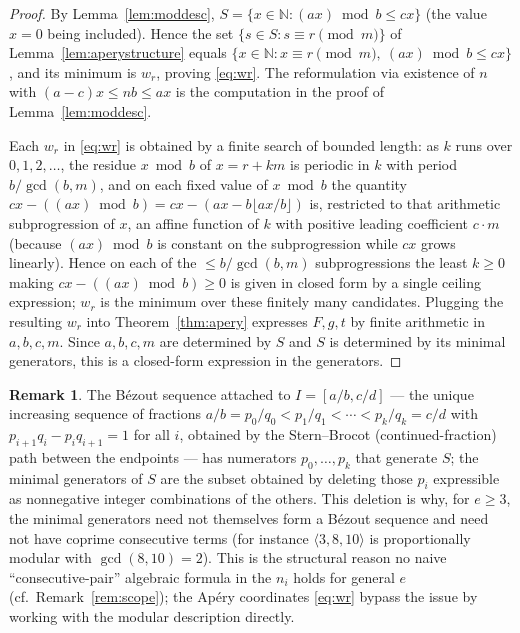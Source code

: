 \documentclass{amsart}
\theoremstyle{definition}
\newtheorem{remark}{Remark}
\newcommand{\NN}{\mathbb{N}}
\begin{document}
\begin{proof}
By Lemma~\ref{lem:moddesc}, $S=\{x\in\NN:(ax)\bmod b\le cx\}$ (the value
$x=0$ being included). Hence the set
$\{s\in S:s\equiv r\pmod m\}$ of Lemma~\ref{lem:aperystructure} equals
$\{x\in\NN:x\equiv r\pmod m,\ (ax)\bmod b\le cx\}$, and its minimum is
$w_r$, proving \eqref{eq:wr}. The reformulation via existence of $n$ with
$(a-c)x\le nb\le ax$ is the computation in the proof of
Lemma~\ref{lem:moddesc}.

Each $w_r$ in \eqref{eq:wr} is obtained by a finite search of bounded
length: as $k$ runs over $0,1,2,\dots$, the residue $x\bmod b$ of
$x=r+km$ is periodic in $k$ with period $b/\gcd(b,m)$, and on each fixed
value of $x\bmod b$ the quantity $cx-((ax)\bmod b)=cx-(ax-b\lfloor
ax/b\rfloor)$ is, restricted to that arithmetic subprogression of $x$, an
affine function of $k$ with positive leading coefficient $c\cdot m$
(because $(ax)\bmod b$ is constant on the subprogression while $cx$ grows
linearly). Hence on each of the $\le b/\gcd(b,m)$ subprogressions the least
$k\ge0$ making $cx-((ax)\bmod b)\ge0$ is given in closed form by a single
ceiling expression; $w_r$ is the minimum over these finitely many
candidates. Plugging the resulting $w_r$ into Theorem~\ref{thm:apery}
expresses $F,g,t$ by finite arithmetic in $a,b,c,m$. Since $a,b,c,m$ are
determined by $S$ and $S$ is determined by its minimal generators, this is
a closed-form expression in the generators.
\end{proof}

\begin{remark}
The B\'ezout sequence attached to $I=[a/b,c/d]$ --- the unique increasing
sequence of fractions $a/b=p_0/q_0<p_1/q_1<\cdots<p_k/q_k=c/d$ with
$p_{i+1}q_i-p_iq_{i+1}=1$ for all $i$, obtained by the Stern--Brocot
(continued-fraction) path between the endpoints --- has numerators
$p_0,\dots,p_k$ that generate $S$; the minimal generators of $S$ are the
subset obtained by deleting those $p_i$ expressible as nonnegative integer
combinations of the others. This deletion is why, for $e\ge3$, the minimal
generators need not themselves form a B\'ezout sequence and need not have
coprime consecutive terms (for instance $\langle3,8,10\rangle$ is
proportionally modular with $\gcd(8,10)=2$). This is the structural reason
no naive ``consecutive-pair'' algebraic formula in the $n_i$ holds for
general $e$ (cf.\ Remark~\ref{rem:scope}); the Ap\'ery coordinates
\eqref{eq:wr} bypass the issue by working with the modular description
directly.
\end{remark}
\end{document}

